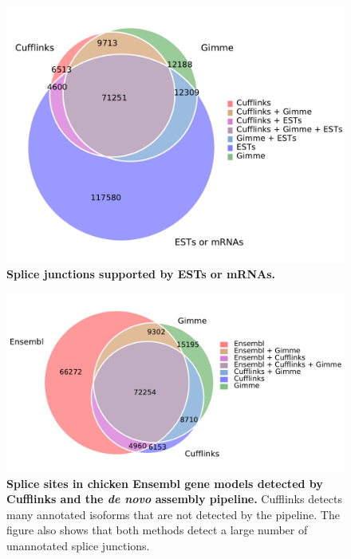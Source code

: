 \documentclass[10pt]{article}
\begin{document}
\begin{figure}[!ht]
\begin{center}
\includegraphics[width=5in]{chick_est_venn.pdf}
\end{center}
\caption{
    {\bf Splice junctions supported by ESTs or mRNAs.}
}
\label{chick_est_venn}
\end{figure}

\begin{figure}[!ht]
\begin{center}
\includegraphics[width=5in]{chick_venn.pdf}
\end{center}
\caption{
{\bf Splice sites in chicken Ensembl gene models detected by Cufflinks and the
{\em de novo} assembly pipeline.} Cufflinks detects many annotated isoforms
that are not detected by the pipeline.  The figure also shows that both methods
detect a large number of unannotated splice junctions.}
\label{chick_venn}
\end{figure}
\end{document}
